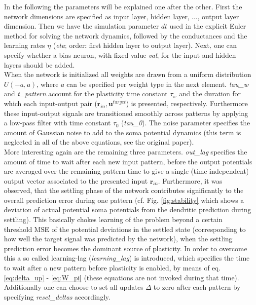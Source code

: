 \documentclass[12pt,a4paper]{article}
\begin{document}
In the following the parameters will be explained one after the other. First the network dimensions are specified as input layer, hidden layer, ..., output layer dimension. Then we have the simulation parameter $dt$ used in the explicit Euler method for solving the network dynamics, followed by the conductances and the learning rates $\eta$ (\textit{eta}; order: first hidden layer to output layer). Next, one can specify whether a bias neuron, with fixed value \textit{val}, for the input and hidden layers should be added.\\
When the network is initialized all weights are drawn from a uniform distribution $U(-a,a)$, where $a$ can be specified per weight type in the next element. \textit{tau\_w} and \textit{t\_pattern} account for the plasticity time constant $\tau_w$ and the duration for which each input-output pair ($\bm{r}_{in},\bm{u}^{target}$) is presented, respectively. Furthermore these input-output signals are transitioned smoothly across patterns by applying a low-pass filter with time constant $\tau_0$ (\textit{tau\_0}). The noise parameter specifies the amount of Gaussian noise to add to the soma potential dynamics (this term is neglected in all of the above equations, see the original paper).\\
More interesting again are the remaining three parameters. \textit{out\_lag} specifies the amount of time to wait after each new input pattern, before the output potentials are averaged over the remaining pattern-time to give a single (time-independent) output vector associated to the presented input $\bm{r}_{in}$. Furthermore, it was observed, that the settling phase of the network contributes significantly to the overall prediction error during one pattern (cf. Fig. \ref{fig:stability} which shows a deviation of actual potential soma potentials from the dendritic prediction during settling). This basically chokes learning of the problem beyond a certain threshold MSE of the potential deviations in the settled state (corresponding to how well the target signal was predicted by the network), when the settling prediction error becomes the dominant source of plasticity. In order to overcome this a so called learning-lag (\textit{learning\_lag}) is introduced, which specifies the time to wait after a new pattern before plasticity is enabled, by means of eq. \eqref{eq:delta_up} - \eqref{eq:W_pi} (these equations are not invoked during that time). Additionally one can choose to set all updates $\Delta$ to zero after each pattern by specifying \textit{reset\_deltas} accordingly.\\
\end{document}
